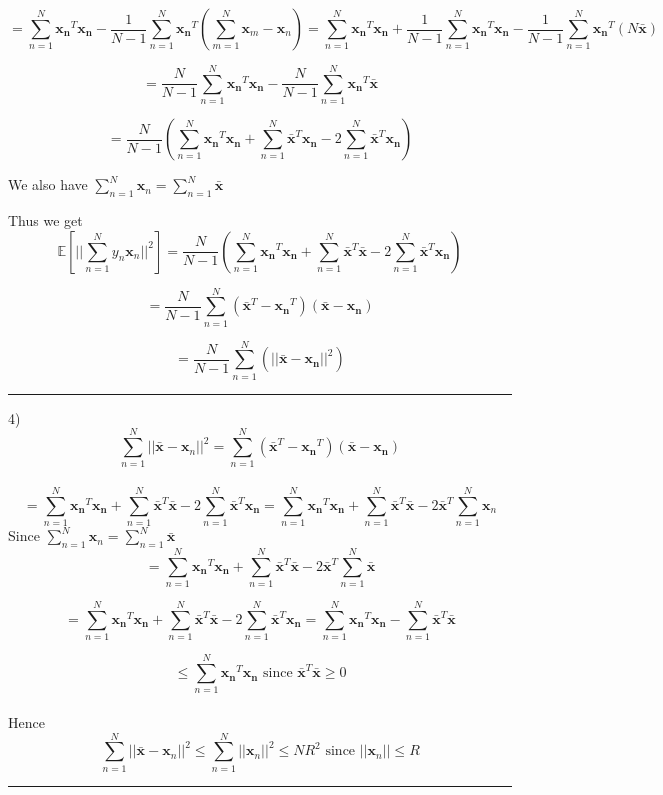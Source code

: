 \documentclass{article}
\begin{document}
$$ = \sum_{n=1}^N \bm{x_n}^T \bm{x_n} - \frac{1}{N-1} \sum_{n=1}^N \bm{x_n}^T(\sum_{m=1}^N \bm{x}_m - \bm{x}_n) = \sum_{n=1}^N \bm{x_n}^T \bm{x_n} + \frac{1}{N-1} \sum_{n=1}^N \bm{x_n}^T\bm{x_n} -\frac{1}{N-1} \sum_{n=1}^N \bm{x_n}^T(N \bm{\bar{x}}) $$

$$ = \frac{N}{N-1}\sum_{n=1}^N \bm{x_n}^T\bm{x_n} - \frac{N}{N-1} \sum_{n=1}^N \bm{x_n}^T \bm{\bar{x}} $$

$$ = \frac{N}{N-1}( \sum_{n=1}^N \bm{x_n}^T\bm{x_n} + \sum_{n=1}^N \bm{\bar{x}}^T \bm{x_n} - 2 \sum_{n=1}^N \bm{\bar{x}}^T \bm{x_n})$$

We also have $ \sum_{n=1}^N \bm{x}_n = \sum_{n=1}^N \bar{\bm{x}} $

Thus we get
$$\mathbb{E}[|| \sum_{n=1}^N y_n \bm{x}_n||^2] = \frac{N}{N-1}( \sum_{n=1}^N \bm{x_n}^T\bm{x_n} + \sum_{n=1}^N  \bar{\bm{x}}^T \bar{\bm{x}} - 2 \sum_{n=1}^N \bar{\bm{x}}^T \bm{x_n}) $$

$$ = \frac{N}{N-1} \sum_{n=1}^N( \bar{\bm{x}}^T - \bm{x_n}^T)( \bar{\bm{x}} - \bm{x_n})$$

$$ = \frac{N}{N-1} \sum_{n=1}^N( || \bar{\bm{x}} - \bm{x_n}||^2) $$
\vspace{2mm}
\par\noindent\rule{\textwidth}{0.8pt}
4)
$$ \sum_{n=1}^{N} || \bm{\bar{x}} - \bm{x}_n ||^2 = \sum_{n=1}^{N} 
 ( \bm{\bar{x}}^T - \bm{x_n}^T)(\bm{\bar{x}} - \bm{x_n}) $$
 \\
 $$ = \sum_{n=1}^N \bm{x_n}^T \bm{x_n} + \sum_{n=1}^N  \bm{\bar{x}}^T \bm{\bar{x}} - 2 \sum_{n=1}^N \bm{\bar{x}}^T \bm{x_n} = \sum_{n=1}^N \bm{x_n}^T \bm{x_n} + \sum_{n=1}^N  \bm{\bar{x}}^T \bm{\bar{x}} -2 \bm{\bar{x}}^T \sum_{n=1}^N \bm{x}_n  $$ 
Since $ \sum_{n=1}^N \bm{x}_n = \sum_{n=1}^N \bar{\bm{x}} $
 $$  = \sum_{n=1}^N \bm{x_n}^T \bm{x_n} + \sum_{n=1}^N  \bm{\bar{x}}^T \bm{\bar{x}} -2 \bm{\bar{x}}^T \sum_{n=1}^N \bm{\bar{x}} $$

$$ = \sum_{n=1}^N \bm{x_n}^T \bm{x_n} + \sum_{n=1}^N  \bm{\bar{x}}^T \bm{\bar{x}} - 2 \sum_{n=1}^N \bm{\bar{x}}^T \bm{x_n} = \sum_{n=1}^N \bm{x_n}^T \bm{x_n} - \sum_{n=1}^N  \bm{\bar{x}}^T \bm{\bar{x}} $$

$$ \leq  \sum_{n=1}^N \bm{x_n}^T \bm{x_n}  \text{ since } \bm{\bar{x}}^T \bm{\bar{x}} \geq 0 $$
\\
Hence $$ \sum_{n=1}^{N} || \bm{\bar{x}} - \bm{x}_n ||^2  \leq \sum_{n=1}^N ||\bm{x}_n||^2 \leq NR^2 \text{ since } ||\bm{x}_n|| \leq R $$
\vspace{2mm}
\par\noindent\rule{\textwidth}{0.8pt}
\end{document}
